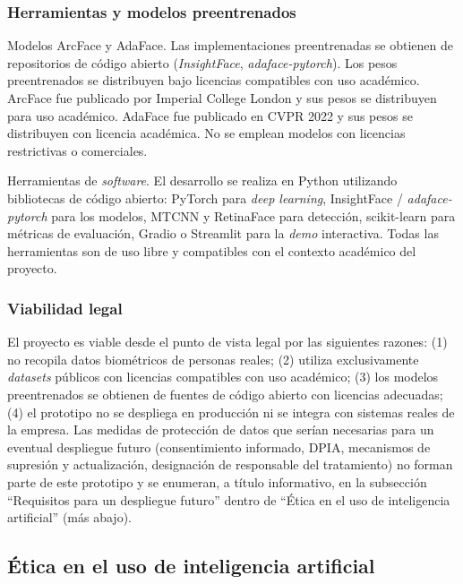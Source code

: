 \documentclass[
  11pt, %
]{charter}
\begin{document}
\subsubsection{Herramientas y modelos preentrenados}

Modelos ArcFace y AdaFace. Las implementaciones preentrenadas se obtienen de repositorios de código abierto (\textit{InsightFace}, \textit{adaface-pytorch}). Los pesos preentrenados se distribuyen bajo licencias compatibles con uso académico. ArcFace fue publicado por Imperial College London y sus pesos se distribuyen para uso académico. AdaFace fue publicado en CVPR 2022 y sus pesos se distribuyen con licencia académica. No se emplean modelos con licencias restrictivas o comerciales.

Herramientas de \textit{software}. El desarrollo se realiza en Python utilizando bibliotecas de código abierto: PyTorch para \textit{deep learning}, InsightFace / \textit{adaface-pytorch} para los modelos, MTCNN y RetinaFace para detección, scikit-learn para métricas de evaluación, Gradio o Streamlit para la \textit{demo} interactiva. Todas las herramientas son de uso libre y compatibles con el contexto académico del proyecto.

\subsubsection{Viabilidad legal}

El proyecto es viable desde el punto de vista legal por las siguientes razones: (1) no recopila datos biométricos de personas reales; (2) utiliza exclusivamente \textit{datasets} públicos con licencias compatibles con uso académico; (3) los modelos preentrenados se obtienen de fuentes de código abierto con licencias adecuadas; (4) el prototipo no se despliega en producción ni se integra con sistemas reales de la empresa. Las medidas de protección de datos que serían necesarias para un eventual despliegue futuro (consentimiento informado, DPIA, mecanismos de supresión y actualización, designación de responsable del tratamiento) no forman parte de este prototipo y se enumeran, a título informativo, en la subsección ``Requisitos para un despliegue futuro'' dentro de ``Ética en el uso de inteligencia artificial'' (más abajo).

\subsection{Ética en el uso de inteligencia artificial}
\end{document}

